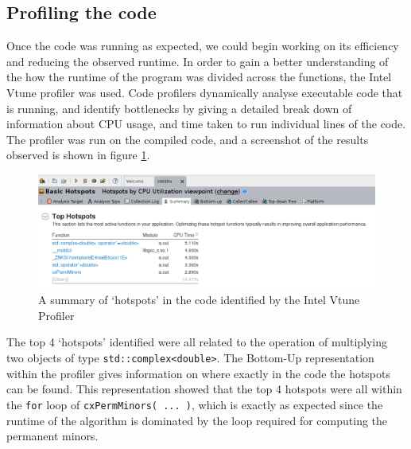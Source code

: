 \documentclass[11pt]{article}
\theoremstyle{theorem}
\theoremstyle{remark}
\theoremstyle{plain}
\theoremstyle{definition}
\begin{document}
\subsection{Profiling the code}
Once the code was running as expected, we could begin working on its efficiency and reducing the observed runtime. In order to gain a better understanding of the how the runtime of the program was divided across the functions, the Intel Vtune profiler\cite{vtune2018} was used. Code profilers dynamically analyse executable code that is running, and identify bottlenecks by giving a detailed break down of information about CPU usage, and time taken to run individual lines of the code. The profiler was run on the compiled code, and a screenshot of the results observed is shown in figure \ref{fig:vtune_hotspots_initial}.
\begin{figure}
  \includegraphics[width=\linewidth, frame]{vtune_hotspots_initial.png}
  \caption{A summary of `hotspots' in the code identified by the Intel Vtune Profiler}
  \label{fig:vtune_hotspots_initial}
\end{figure}
The top 4 `hotspots' identified were all related to the operation of multiplying two objects of type \texttt{std::complex<double>}. The Bottom-Up representation within the profiler gives information on where exactly in the code the hotspots can be found. This representation showed that the top 4 hotspots were all within the \texttt{for} loop of \texttt{cxPermMinors( ... )}, which is exactly as expected since the runtime of the algorithm is dominated by the loop required for computing the permanent minors.
\end{document}
